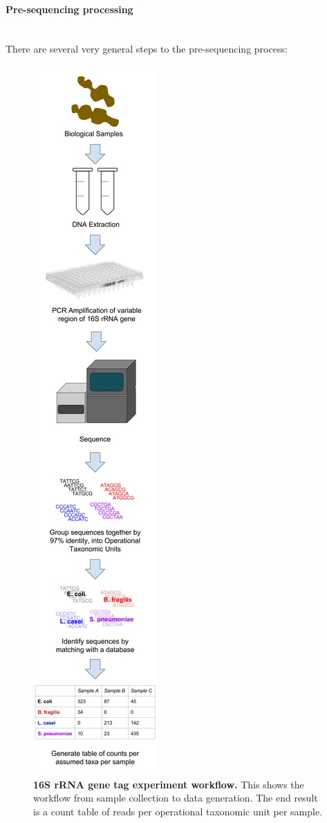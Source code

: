 \paragraph{Pre-sequencing processing}\mbox{}\\
There are several very general steps to the pre-sequencing process:

\begin{figure}[h]
\begin{center}
\includegraphics[height=0.8\textheight]{16S_rRNA_pipeline.png}
\caption[16S rRNA gene tag experiment workflow.]{\textbf{16S rRNA gene tag experiment workflow.} This shows the workflow from sample collection to data generation. The end result is a count table of reads per operational taxonomic unit per sample.}
\end{center}
\end{figure}

